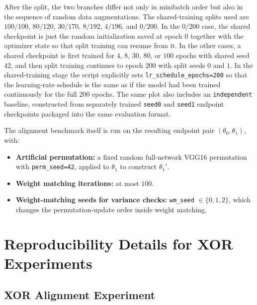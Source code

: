 \documentclass[11pt,a4paper]{report}
\begin{document}
After the split, the two branches differ not only in minibatch order but also in the sequence of random data augmentations. The shared-training splits used are \(100/100\), \(80/120\), \(30/170\), \(8/192\), \(4/196\), and \(0/200\). In the \(0/200\) case, the shared checkpoint is just the random initialization saved at epoch \(0\) together with the optimizer state so that split training can resume from it. In the other cases, a shared checkpoint is first trained for \(4\), \(8\), \(30\), \(80\), or \(100\) epochs with shared seed \(42\), and then split training continues to epoch \(200\) with split seeds \(0\) and \(1\). In the shared-training stage the script explicitly sets \texttt{lr\_schedule\_epochs=200} so that the learning-rate schedule is the same as if the model had been trained continuously for the full \(200\) epochs. The same plot also includes an \texttt{independent} baseline, constructed from separately trained \texttt{seed0} and \texttt{seed1} endpoint checkpoints packaged into the same evaluation format.

The alignment benchmark itself is run on the resulting endpoint pair \((\theta_0,\theta_1)\), with:
\begin{itemize}
    \item \textbf{Artificial permutation:} a fixed random full-network VGG16 permutation with \texttt{perm\_seed=42}, applied to \(\theta_1\) to construct \(\theta_1'\).
    \item \textbf{Weight matching iterations:} at most \(100\).
    \item \textbf{Weight-matching seeds for variance checks:} \texttt{wm\_seed} \(\in \{0,1,2\}\), which changes the permutation-update order inside weight matching.
\end{itemize}

\section{Reproducibility Details for XOR Experiments}
\label{app:xor_repro}

\subsection{XOR Alignment Experiment}
\end{document}
